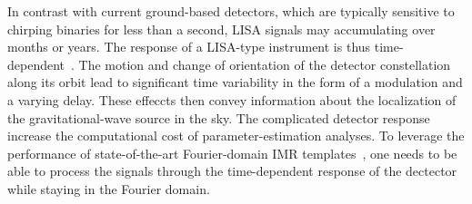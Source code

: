 \documentclass[aps,showpacs,twocolumn,
prd,superscriptaddress,nofootinbib]{revtex4-1}
\newcommand{\jgb}[1]{{\color{DarkGreen} #1}}
\begin{document}

In contrast with current ground-based detectors, which are typically sensitive to chirping binaries for less than a second, LISA signals may accumulating over months or years.
The response of a LISA-type instrument is thus time-dependent~\cite{Cutler97}.
The motion and change of orientation of the detector constellation along its orbit lead to significant time variability in the form of a modulation and a varying delay. These effeccts then convey information about the localization of the gravitational-wave source in the sky. The complicated detector response increase the computational cost of parameter-estimation analyses. To leverage the performance of state-of-the-art Fourier-domain IMR templates~\cite{BTB16,Khan+15}, one needs to be able to process the signals through the time-dependent response of the dectector while staying in the Fourier domain.
\end{document}
